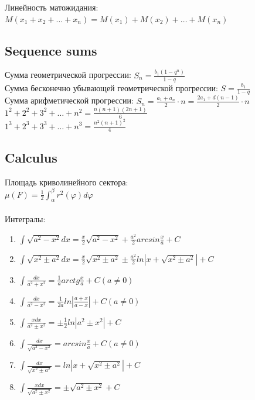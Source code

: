 Линейность матожидания: $M(x_1 + x_2 + \dots + x_n) = M(x_1) + M(x_2) + \dots + M(x_n)$
\subsection{Sequence sums}
Сумма геометрической прогрессии: $S_n = \frac{b_1 (1 - q^n)}{1 - q}$ \\
Сумма бесконечно убывающей геометрической прогрессии: $S = \frac{b_1}{1 - q}$ \\
Сумма арифметической прогрессии: $S_n = \frac{a_1 + a_n}{2} \cdot n = \frac{2a_1 + d(n - 1)}{2} \cdot n$ \\
$1^2 + 2^2 + 3^2 + \dots + n^2 = \frac{n(n + 1)(2n + 1)}{6}$ \\
$1^3 + 2^3 + 3^3 + \dots + n^3 = \frac{n^2 (n + 1)^2}{4}$ \\
\subsection{Calculus}
Площадь криволинейного сектора:\\
$\mu(F) = \frac{1}{2} \int_{\alpha}^{\beta} r^2(\varphi) d\varphi$ \\\\
Интегралы:
\begin{enumerate}
	\item $ \int \sqrt{a^2 - x^2} dx = \frac{x}{2} \sqrt{a^2 - x^2} + \frac{a^2}{2} arcsin \frac{x}{a} + C $ \\
	\item $ \int \sqrt{x^2 \pm a^2} dx = \frac{x}{2} \sqrt {x^2 \pm a^2} \pm \frac{a^2}{2} ln |x + \sqrt{x^2 \pm a^2}| + C $ \\
	\item $ \int \frac{dx}{a^2 + x^2} = \frac{1}{a} arctg \frac{x}{a} + C (a \ne 0) $ \\
	\item $ \int \frac{dx}{a^2 - x^2} = \frac{1}{2a} ln |\frac{a + x}{a - x}| + C (a \ne 0) $ \\
	\item $ \int \frac{x dx}{a^2 \pm x^2} = \pm \frac{1}{2} ln |a^2 \pm x^2| + C $ \\
	\item $ \int \frac{dx}{\sqrt{a^2 - x^2}} = arcsin \frac{x}{a} + C (a \ne 0) $ \\
	\item $ \int \frac{dx}{\sqrt{x^2 \pm a^2}} = ln |x + \sqrt{x^2 \pm a^2}| + C $ \\
	\item $ \int \frac{x dx}{\sqrt{a^2 \pm x^2}} = \pm \sqrt{a^2 \pm x^2} + C $ \\
\end{enumerate}
